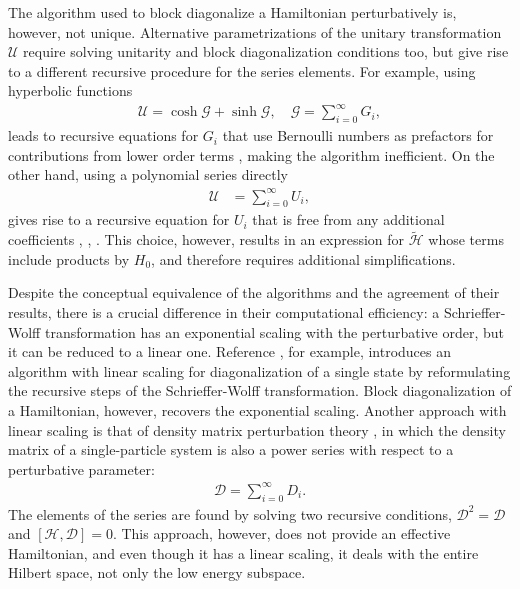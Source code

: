 The algorithm used to block diagonalize a Hamiltonian perturbatively is,
however, not unique.
Alternative parametrizations of the unitary transformation $\mathcal{U}$
require solving unitarity and block diagonalization conditions too, but
give rise to a different recursive procedure for the series elements.
For example, using hyperbolic functions
%
\begin{gather}
\mathcal{U} = \cosh{\mathcal{G}} + \sinh{\mathcal{G}}, \quad
\mathcal{G} = \sum_{i=0}^{\infty} G_i,
\end{gather}
%
leads to recursive equations for $G_i$ that use Bernoulli numbers as
prefactors for contributions from lower order terms \cite{Shavitt_1980},
making the algorithm inefficient.
On the other hand, using a polynomial series directly
%
\begin{align}
\mathcal{U} &= \sum_{i=0}^{\infty} U_i,
\end{align}
%
gives rise to a recursive equation for $U_i$ that is free from any additional
coefficients
\cite{Van_Vleck_1929}, \cite{Lowdin_1962}
\cite{Klein_1974}, \cite{Suzuki_1983}.
This choice, however, results in an expression for $\tilde{\mathcal{H}}$ whose
terms include products by $H_0$, and therefore requires additional
simplifications.

Despite the conceptual equivalence of the algorithms and the agreement of
their results, there is a crucial difference in their computational efficiency:
a Schrieffer-Wolff transformation has an exponential scaling with the
perturbative order, but it can be reduced to a linear one.
Reference \cite{Li_2022}, for example, introduces an
algorithm with linear scaling for diagonalization of a single state by
reformulating the recursive steps of the Schrieffer-Wolff transformation.
Block diagonalization of a Hamiltonian, however, recovers the exponential
scaling.
Another approach with linear scaling is that of density matrix perturbation
theory \cite{McWeeny_1962,McWeeny_1968,Truflandier_2020}, in which the
density matrix of a single-particle system is also a power series with
respect to a perturbative parameter:
%
\begin{align}
  \mathcal{D} = \sum_{i=0}^{\infty} D_i.
\end{align}
%
The elements of the series are found by solving two recursive conditions,
$\mathcal{D}^2 = \mathcal{D}$ and $[\mathcal{H}, \mathcal{D}]=0$.
This approach, however, does not provide an effective Hamiltonian, and even
though it has a linear scaling, it deals with the entire Hilbert space, not
only the low energy subspace.

